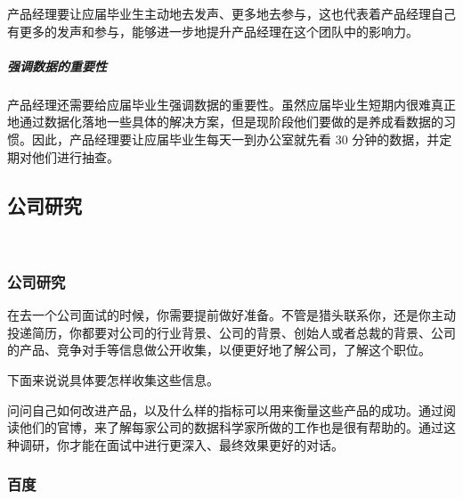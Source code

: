 \documentclass[letterpaper,11pt,english]{sphinxmanual}
\begin{document}
产品经理要让应届毕业生主动地去发声、更多地去参与，这也代表着产品经理自己有更多的发声和参与，能够进一步地提升产品经理在这个团队中的影响力。


\subparagraph{强调数据的重要性}
\label{\detokenize{chapter_AI_dive/develop:id9}}
产品经理还需要给应届毕业生强调数据的重要性。虽然应届毕业生短期内很难真正地通过数据化落地一些具体的解决方案，但是现阶段他们要做的是养成看数据的习惯。因此，产品经理要让应届毕业生每天一到办公室就先看
30 分钟的数据，并定期对他们进行抽查。


\subsection{公司研究}
\label{\detokenize{chapter_company/index:chap-company}}\label{\detokenize{chapter_company/index:id1}}\label{\detokenize{chapter_company/index::doc}}
​


\subsubsection{公司研究}
\label{\detokenize{chapter_company/company_research:id1}}\label{\detokenize{chapter_company/company_research::doc}}
在去一个公司面试的时候，你需要提前做好准备。不管是猎头联系你，还是你主动投递简历，你都要对公司的行业背景、公司的背景、创始人或者总裁的背景、公司的产品、竞争对手等信息做公开收集，以便更好地了解公司，了解这个职位。

下面来说说具体要怎样收集这些信息。%
\begin{footnote}[869]\sphinxAtStartFootnote
{}
%
\end{footnote}

问问自己如何改进产品，以及什么样的指标可以用来衡量这些产品的成功。通过阅读他们的官博，来了解每家公司的数据科学家所做的工作也是很有帮助的。通过这种调研，你才能在面试中进行更深入、最终效果更好的对话。
%
\begin{footnote}[870]\sphinxAtStartFootnote
{}
%
\end{footnote}


\subsubsection{百度}
\label{\detokenize{chapter_company/baidu:id1}}\label{\detokenize{chapter_company/baidu::doc}}
\end{document}
